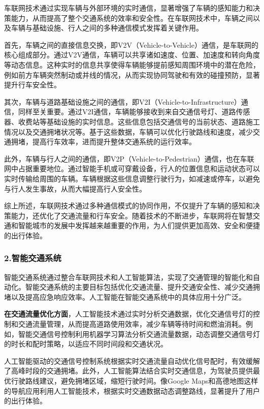 车联网技术通过实现车辆与外部环境的实时通信，显著增强了车辆的感知能力和决策能力，从而提高了整个交通系统的效率和安全性。在车联网技术中，车辆之间以及车辆与基础设施、行人之间的多种通信模式发挥着关键作用。

首先，车辆之间的直接信息交换，即V2V（Vehicle-to-Vehicle）通信，是车联网的核心组成部分。通过V2V通信，车辆可以共享诸如速度、位置、加速度和转向角度等动态信息。这种实时的信息共享使得车辆能够提前感知周围环境中的潜在危险，例如前方车辆突然制动或并线的情况，从而实现协同驾驶和有效的碰撞预防，显著提升行车安全性。

其次，车辆与道路基础设施之间的通信，即V2I（Vehicle-to-Infrastructure）通信，同样至关重要。通过V2I通信，车辆能够接收到来自交通信号灯、道路传感器、收费站等基础设施的实时信息。这些信息包括交通信号的当前状态、道路施工情况以及交通拥堵状况等。基于这些数据，车辆可以优化行驶路线和速度，减少交通拥堵，提高行车效率，进而提升整体交通系统的运行效率。

此外，车辆与行人之间的通信，即V2P（Vehicle-to-Pedestrian）通信，也在车联网中占据重要地位。通过智能手机或可穿戴设备，行人的位置信息和运动状态可以实时传输给周围的车辆。车辆根据这些信息调整行驶行为，如减速或停车，以避免与行人发生事故，从而大幅提高行人安全性。

综上所述，车联网技术通过多种通信模式的协同作用，不仅提升了车辆的感知和决策能力，还优化了交通流量和行车安全。随着技术的不断进步，车联网将在智慧交通和智能城市的发展中发挥越来越重要的作用，为人们提供更加高效、安全和便捷的出行体验。

\subsubsection{2.智能交通系统}

智能交通系统通过整合车联网技术和人工智能算法，实现了交通管理的智能化和自动化。智能交通系统的主要目标包括优化交通流量、提升交通安全性、减少交通拥堵以及提高应急响应效率。人工智能在智能交通系统中的具体应用十分广泛。

\textbf{在交通流量优化方面}，人工智能技术通过实时分析交通数据，优化交通信号灯的控制和交通流量管理，从而提高道路使用效率，减少车辆等待时间和燃油消耗。例如，智能交通信号控制利用机器学习算法分析交通流量数据，动态调整交通信号灯的时长和配时策略，以适应不同时间段和交通状况。

人工智能驱动的交通信号控制系统根据实时交通流量自动优化信号配时，有效缓解了高峰时段的交通拥堵。此外，人工智能算法结合实时交通信息，为驾驶员提供最优行驶路线建议，避免拥堵区域，缩短行驶时间。像Google Maps和高德地图这样的导航应用利用人工智能技术，根据实时交通数据动态调整路线，显著提升了用户的出行体验。

